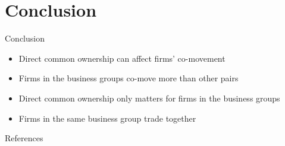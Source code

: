 \documentclass[handout]{beamer}
\begin{document}
	
	\section{Conclusion}
	
	\begin{frame}{Conclusion}
		\begin{itemize}
			
			
			
			\item Direct common ownership can affect firms' co-movement
			\item 
			Firms in the business groups co-move more than other pairs
			\item Direct common ownership only matters for firms in the business groups
			\item Firms in the same business group trade together
			
		\end{itemize}
	\end{frame}
	

	
	
	\color{black}
	\appendix
	
	\tiny
	\begin{frame}[allowframebreaks]{References}
		
		{		
			
			
		}
	\end{frame}
	
	\normalsize	
	
	
	
	
\end{document}
